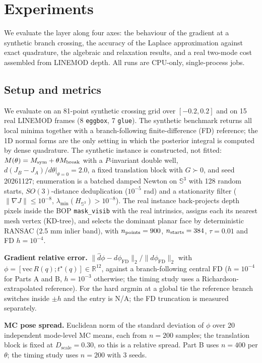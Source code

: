 \section{Experiments}\label{sec:experiments}

We evaluate the layer along four axes: the behaviour of the gradient at a synthetic branch crossing, the accuracy of the Laplace approximation against exact quadrature, the algebraic and relaxation results, and a real two-mode cost assembled from LINEMOD depth. All runs are CPU-only, single-process jobs.

\subsection{Setup and metrics}\label{sec:metrics}

We evaluate on an 81-point synthetic crossing grid over $[-0.2,0.2]$ and on 15 real LINEMOD frames (8 \texttt{eggbox}, 7 \texttt{glue}). The synthetic benchmark returns all local minima together with a branch-following finite-difference (FD) reference; the 1D normal forms are the only setting in which the posterior integral is computed by dense quadrature. The synthetic instance is constructed, not fitted: $M(\theta)=M_{\rm sym}+\theta M_{\rm break}$ with a $P$-invariant double well, $d(J_B-J_A)/d\theta|_{\theta=0}=2.0$, a fixed translation block with $G\succ0$, and seed 20261127; enumeration is a batched damped Newton on $\mathbb{S}^3$ with 128 random starts, $SO(3)$-distance deduplication ($10^{-5}$ rad) and a stationarity filter ($\|\nabla J\|\le10^{-8}$, $\lambda_{\min}(H_{\mathbb{S}^3})>10^{-8}$). The real instance back-projects depth pixels inside the BOP \texttt{mask\_visib} with the real intrinsics, assigns each its nearest mesh vertex (KD-tree), and selects the dominant planar face by deterministic RANSAC (2.5 mm inlier band), with $n_{\rm points}=900$, $n_{\rm starts}=384$, $\tau=0.01$ and FD $h=10^{-4}$.

\textbf{Gradient relative error.} $\|\hat d\phi-d\phi_{\mathrm{FD}}\|_2/\|d\phi_{\mathrm{FD}}\|_2$ with $\phi=[\mathrm{vec}\,R(q);t^\star(q)]\in\mathbb{R}^{12}$, against a branch-following central FD ($h=10^{-4}$ for Parts A and B, $h=10^{-3}$ otherwise; the timing study uses a Richardson-extrapolated reference). For the hard argmin at a global tie the reference branch switches inside $\pm h$ and the entry is N/A; the FD truncation is measured separately.

\textbf{MC pose spread.} Euclidean norm of the standard deviation of $\phi$ over 20 independent mode-level MC means, each from $n=200$ samples; the translation block is fixed at $D_{\text{scale}}=0.30$, so this is a relative spread. Part B uses $n=400$ per $\theta$; the timing study uses $n=200$ with 3 seeds.

